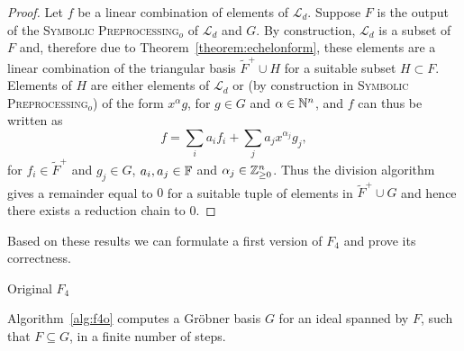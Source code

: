 \begin{proof} \cite[p.60]{Segers2004}
Let $f$ be a linear combination of elements of $\mathcal{L}_d$. Suppose $F$ is the output of the \textsc{Symbolic Preprocessing$_o$} of $\mathcal{L}_d$ and $G$.
By construction, $\mathcal{L}_d$ is a subset of $F$ and, therefore due to
Theorem~\ref{theorem:echelonform}, these elements are a linear
combination of the triangular basis $\tilde{F}^+ \cup H$ for a suitable subset
$H \subset F$. Elements of $H$ are either elements of $\mathcal{L}_d$ or (by
construction in \textsc{Symbolic Preprocessing$_o$}) of the form $x^\alpha g$,
for
$g \in G$ and $\alpha \in \mathbb{N}^n$, and $f$  can thus be written as
\[
f = \sum_i a_if_i + \sum_j a_jx^{\alpha_j}g_j,
\]
for $f_i \in \tilde{F}^+$ and $g_j \in G$, $a_i , a_j \in \mathbb{F}$ and $\alpha_j \in \mathbb{Z}_{\geq 0}^n$. Thus the division algorithm  gives a remainder equal to $0$ for a suitable tuple of elements in $\tilde{F}^+ \cup G$ and hence there exists a reduction chain to 0.
\end{proof}

Based on these results we can formulate a first version of $F_4$ and prove its correctness.

\begin{algorithm}

\caption{Original $F_{4}$} 
\label{alg:f4o}
\end{algorithm}

\begin{theorem}
Algorithm~\ref{alg:f4o} computes a Gröbner basis $G$ for an ideal spanned by $F$, such that $F \subseteq G$, in
a finite number of steps.
\end{theorem}

